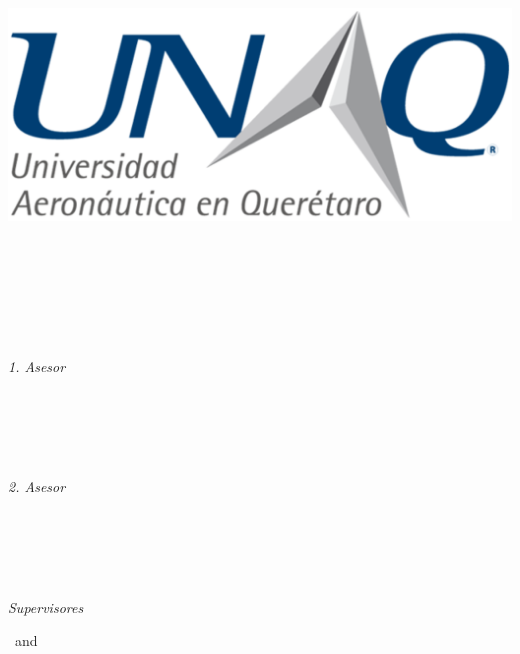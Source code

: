 \begin{titlepage}
	\tgherosfont
	\centering

	{\Large \thesisUniversity} \\[4mm]
	\includegraphics[scale=0.3]{Contenido/Titulo/UNAQ.eps}\\[2mm]
	\textsf{\thesisUniversityDepartment} \\
	\textsf{\thesisUniversityInstitute} \\
	\textsf{\thesisUniversityGroup} \\

	\vfill
	{\large \thesisSubject} \\[5mm]
	{\LARGE \color{ctcolortitle}\textbf{\thesisTitle} \\[10mm]}
	{\Large \thesisName} \\

	\vfill
	\begin{minipage}[t]{.27\textwidth}
		\raggedleft
		\textit{1. Asesor}
	\end{minipage}
	\hspace*{15pt}
	\begin{minipage}[t]{.65\textwidth}
		{\Large \thesisFirstReviewer} \\
	  	{\small \thesisFirstReviewerDepartment} \\[-1mm]
		{\small \thesisFirstReviewerUniversity}
	\end{minipage} \\[5mm]
	\begin{minipage}[t]{.27\textwidth}
		\raggedleft
		\textit{2. Asesor}
	\end{minipage}
	\hspace*{15pt}
	\begin{minipage}[t]{.65\textwidth}
		{\Large \thesisSecondReviewer} \\
	  	{\small \thesisSecondReviewerDepartment} \\[-1mm]
		{\small \thesisSecondReviewerUniversity}
	\end{minipage} \\[10mm]
	\begin{minipage}[t]{.27\textwidth}
		\raggedleft
		\textit{Supervisores}
	\end{minipage}
	\hspace*{15pt}
	\begin{minipage}[t]{.65\textwidth}
		\thesisFirstSupervisor\ and \thesisSecondSupervisor
	\end{minipage} \\[10mm]


\end{titlepage}
